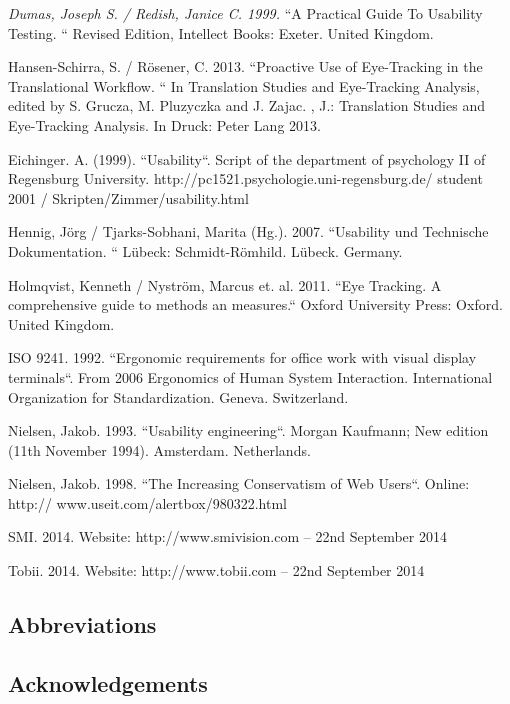\documentclass[output=paper]{langsci/langscibook}
\begin{document}
\emph{Dumas, Joseph S. / Redish, Janice C. 1999. }“A Practical Guide To Usability Testing. “ Revised Edition, Intellect Books: Exeter. United Kingdom.



Hansen-Schirra, S. / Rösener, C. 2013. “Proactive Use of Eye-Tracking in the Translational Workflow. “ In Translation Studies and Eye-Tracking Analysis, edited by S. Grucza, M. Pluzyczka and J. Zajac. , J.: Translation Studies and Eye-Tracking Analysis. In Druck: Peter Lang 2013.



Eichinger. A. (1999). “Usability“. Script of the department of psychology II of Regensburg University. http://pc1521.psychologie.uni-regensburg.de/ student 2001 / Skripten/Zimmer/usability.html



Hennig, Jörg / Tjarks-Sobhani, Marita (Hg.). 2007. “Usability und Technische Dokumentation. “ Lübeck: Schmidt-Römhild. Lübeck. Germany.



Holmqvist, Kenneth / Nyström, Marcus et. al. 2011. “Eye Tracking. A comprehensive guide to methods an measures.“ Oxford University Press: Oxford. United Kingdom.



ISO 9241. 1992. “Ergonomic requirements for office work with visual display terminals“. From 2006 {\textquotedbl}Ergonomics of Human System Interaction{\textquotedbl}. International Organization for Standardization. Geneva. Switzerland.



Nielsen, Jakob. 1993. “Usability engineering“. Morgan Kaufmann; New edition (11th November 1994). Amsterdam. Netherlands.



Nielsen, Jakob. 1998. “The Increasing Conservatism of Web Users“. Online: http:// www.useit.com/alertbox/980322.html



SMI. 2014. Website: http://www.smivision.com – 22nd September 2014



Tobii. 2014. Website: http://www.tobii.com – 22nd September 2014



\subsection*{Abbreviations}
\subsection*{Acknowledgements}

\printbibliography[heading=subbibliography,notkeyword=this]
\end{document}
